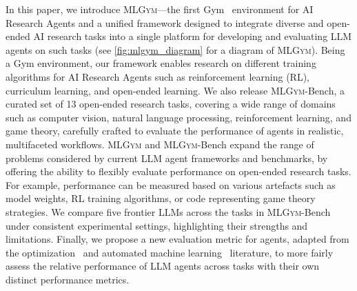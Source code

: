 \documentclass[]{fairmeta}
\newcommand{\dn}[1]{\colorbox{magenta}{\textcolor{white}{Deepak}}\textcolor{magenta}{\textbf{:#1}}}
\newcommand{\dm}[1]{\colorbox{Emerald}{\textcolor{white}{Despoina}}\textcolor{Emerald}{\textbf{:#1}}}
\newcommand{\mlgym}{\fontfamily{lmr}\selectfont\mdseries\textsc{MLGym}\xspace}
\begin{document}
In this paper, we introduce \mlgym---the first Gym~\citep{brockman2016openaigym} environment for AI Research Agents and a unified framework designed to integrate diverse and open-ended AI research tasks into a single platform for developing and evaluating LLM agents on such tasks (see \autoref{fig:mlgym_diagram} for a diagram of \mlgym). Being a Gym environment, our framework enables research on different training algorithms for AI Research Agents such as reinforcement learning (RL), curriculum learning, and open-ended learning. 
%
We also release \mlgym-Bench, a curated set of 13 
open-ended research tasks, covering a wide range of domains such as computer vision, natural language processing, reinforcement learning, and game theory, carefully crafted to evaluate the performance of agents in realistic, multifaceted workflows. 
%
\mlgym and \mlgym-Bench expand the range of problems considered by current LLM agent frameworks and benchmarks, by offering the ability to flexibly evaluate performance on open-ended research tasks. For example, performance can be measured based on various artefacts such as model weights, RL training algorithms, or code representing game theory strategies.
%
We compare five frontier LLMs across the tasks in \mlgym-Bench under consistent experimental settings, highlighting their strengths and limitations. 
%
Finally, we propose a new evaluation metric for agents, adapted from the optimization~\citep{dolanBenchmarkingOptimizationSoftware2002} and automated machine learning~\citep[AutoML;][]{automldecathlon} literature, to more fairly assess the relative performance of LLM agents across tasks with their own distinct performance metrics. 

\end{document}
